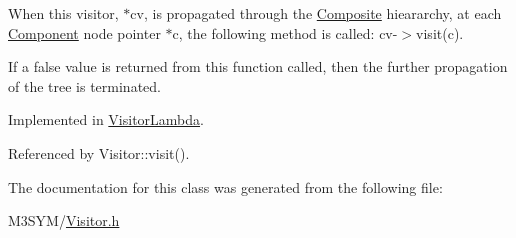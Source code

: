 When this visitor, $\ast$cv, is propagated through the \hyperlink{classComposite}{Composite} hieararchy, at each \hyperlink{classComponent}{Component} node pointer $\ast$c, the following method is called\+: cv-\/$>$visit(c). 

If a false value is returned from this function called, then the further propagation of the tree is terminated. 

Implemented in \hyperlink{classVisitorLambda_af934df1d8669dd315d824d9ee706f250}{Visitor\+Lambda}.



Referenced by Visitor\+::visit().



The documentation for this class was generated from the following file\+:\begin{DoxyCompactItemize}
\item 
M3\+S\+Y\+M/\hyperlink{Visitor_8h}{Visitor.\+h}\end{DoxyCompactItemize}
